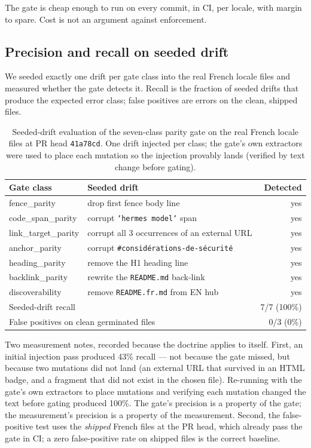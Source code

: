 \documentclass[11pt]{article}
\theoremstyle{definition}
\theoremstyle{plain}
\theoremstyle{remark}
\begin{document}
The gate is cheap enough to run on every commit, in CI, per locale, with
margin to spare. Cost is not an argument against enforcement.

\subsection{Precision and recall on seeded drift}

We seeded exactly one drift per gate class into the real French locale files
and measured whether the gate detects it. Recall is the fraction of seeded
drifts that produce the expected error class; false positives are errors on
the clean, shipped files.

\begin{table}[H]
\centering
\caption{Seeded-drift evaluation of the seven-class parity gate on the real
French locale files at PR head \texttt{41a78cd}. One drift injected per
class; the gate's own extractors were used to place each mutation so the
injection provably lands (verified by text change before gating).}
\label{tab:recall}
\begin{tabular}{llr}
\toprule
Gate class & Seeded drift & Detected \\
\midrule
fence\_parity & drop first fence body line & yes \\
code\_span\_parity & corrupt \texttt{`hermes model`} span & yes \\
link\_target\_parity & corrupt all 3 occurrences of an external URL & yes \\
anchor\_parity & corrupt \texttt{\#consid\'erations-de-s\'ecurit\'e} & yes \\
heading\_parity & remove the H1 heading line & yes \\
backlink\_parity & rewrite the \texttt{README.md} back-link & yes \\
discoverability & remove \texttt{README.fr.md} from EN hub & yes \\
\midrule
\multicolumn{2}{l}{Seeded-drift recall} & 7/7 (100\%) \\
\multicolumn{2}{l}{False positives on clean germinated files} & 0/3 (0\%) \\
\bottomrule
\end{tabular}
\end{table}

Two measurement notes, recorded because the doctrine applies to itself.
First, an initial injection pass produced 43\% recall --- not because the
gate missed, but because two mutations did not land (an external URL that
survived in an HTML badge, and a fragment that did not exist in the chosen
file). Re-running with the gate's own extractors to place mutations and
verifying each mutation changed the text before gating produced 100\%. The
gate's precision is a property of the gate; the measurement's precision is a
property of the measurement. Second, the false-positive test uses the
\emph{shipped} French files at the PR head, which already pass the gate in
CI; a zero false-positive rate on shipped files is the correct baseline.
\end{document}
